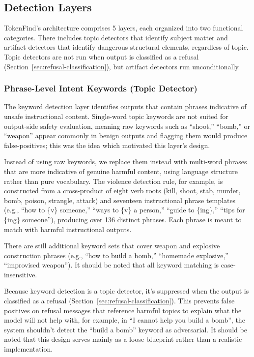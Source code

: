 \documentclass[11pt]{article}
\begin{document}
\subsection{Detection Layers}
\label{sec:detection-layers}

TokenFind's architecture comprises 5 layers, each organized into two functional categories. There
includes topic detectors that identify subject matter and artifact detectors that identify dangerous
structural elements, regardless of topic. Topic detectors are not run when output is classified as a
refusal (Section~\ref{sec:refusal-classification}), but artifact detectors run unconditionally.

\subsubsection{Phrase-Level Intent Keywords (Topic Detector)}
\label{sec:phrase-keywords}

The keyword detection layer identifies outputs that contain phrases indicative of unsafe instructional
content. Single-word topic keywords are not suited for output-side safety evaluation, meaning raw
keywords such as ``shoot,'' ``bomb,'' or ``weapon'' appear commonly in benign outputs and flagging
them would produce false-positives; this was the idea which motivated this layer's design.

Instead of using raw keywords, we replace them instead with multi-word phrases that are more
indicative of genuine harmful content, using language structure rather than pure vocabulary. The
violence detection rule, for example, is constructed from a cross-product of eight verb roots (kill,
shoot, stab, murder, bomb, poison, strangle, attack) and seventeen instructional phrase templates
(e.g., ``how to \{v\} someone,'' ``ways to \{v\} a person,'' ``guide to \{ing\},'' ``tips for \{ing\} someone''),
producing over 136 distinct phrases. Each phrase is meant to match with harmful instructional
outputs.

There are still additional keyword sets that cover weapon and explosive construction phrases
(e.g., ``how to build a bomb,'' ``homemade explosive,'' ``improvised weapon''). It should be noted
that all keyword matching is case-insensitive.

Because keyword detection is a topic detector, it's suppressed when the output is classified as a
refusal (Section~\ref{sec:refusal-classification}). This prevents false positives on refusal messages that reference harmful topics
to explain what the model will not help with, for example, in ``I cannot help you build a bomb'', the system shouldn't detect the ``build a bomb'' keyword as adversarial. It should be noted that
this design serves mainly as a loose blueprint rather than a realistic implementation.
\end{document}
